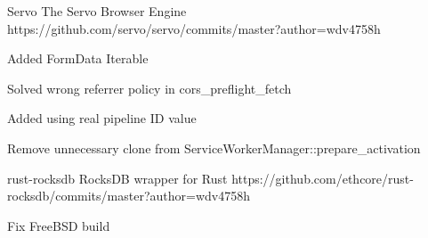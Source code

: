 
\begin{cvopensources}


  \cvopensource
    {Servo}
    {The Servo Browser Engine}
    {https://github.com/servo/servo/commits/master?author=wdv4758h}
    {
      \begin{cvitems}
        \item {Added FormData Iterable}
        \item {Solved wrong referrer policy in cors\_preflight\_fetch}
        \item {Added using real pipeline ID value}
        \item {Remove unnecessary clone from ServiceWorkerManager::prepare\_activation}
      \end{cvitems}
    }

  \cvopensource
    {rust-rocksdb}
    {RocksDB wrapper for Rust}
    {https://github.com/ethcore/rust-rocksdb/commits/master?author=wdv4758h}
    {
      \begin{cvitems}
        \item {Fix FreeBSD build}
      \end{cvitems}
    }


\end{cvopensources}
